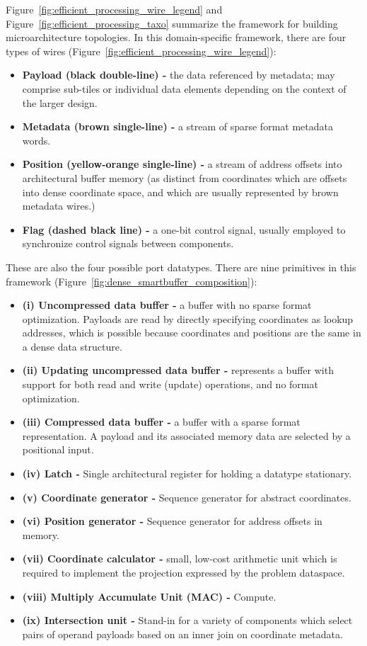 Figure~\ref{fig:efficient_processing_wire_legend} and Figure~\ref{fig:efficient_processing_taxo} summarize the framework for building microarchitecture topologies. In this domain-specific framework, there are four types of wires (Figure~\ref{fig:efficient_processing_wire_legend}):

\begin{itemize}
    \item \textbf{Payload (black double-line) -} the data referenced by metadata; may comprise sub-tiles or individual data elements depending on the context of the larger design.
    \item \textbf{Metadata (brown single-line) -} a stream of sparse format metadata words.
    \item \textbf{Position (yellow-orange single-line) -} a stream of address offsets into architectural buffer memory (as distinct from coordinates which are offsets into dense coordinate space, and which are usually represented by brown metadata wires.)
    \item \textbf{Flag (dashed black line) -} a one-bit control signal, usually employed to synchronize control signals between components.
\end{itemize}

These are also the four possible port datatypes. There are nine primitives in this framework (Figure~\ref{fig:dense_smartbuffer_composition}):

\begin{itemize}
    \item \textbf{(i) Uncompressed data buffer -} a buffer with no sparse format optimization. Payloads are read by directly specifying coordinates as lookup addresses, which is possible because coordinates and positions are the same in a dense data structure. 
    \item \textbf{(ii) Updating uncompressed data buffer -} represents a buffer with support for both read and write (update) operations, and no format optimization.
    \item \textbf{(iii) Compressed data buffer - } a buffer with a sparse format representation. A payload and its associated memory data are selected by a positional input.
    \item \textbf{(iv) Latch - } Single architectural register for holding a datatype stationary.
    \item \textbf{(v) Coordinate generator - } Sequence generator for abstract coordinates.
    \item \textbf{(vi) Position generator - } Sequence generator for address offsets in memory.
    \item \textbf{(vii) Coordinate calculator - } small, low-cost arithmetic unit which is required to implement the projection expressed by the problem dataspace.
    \item \textbf{(viii) Multiply Accumulate Unit (MAC) - } Compute.
    \item \textbf{(ix) Intersection unit - } Stand-in for a variety of components which select pairs of operand payloads based on an inner join on coordinate metadata.
\end{itemize}

